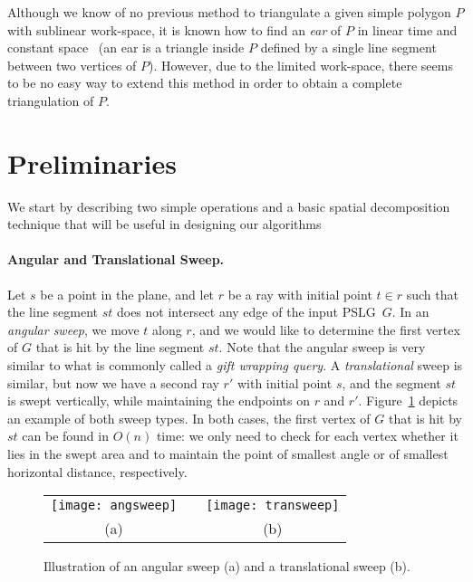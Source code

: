 \documentclass[11pt,a4paper]{article}
\newcommand{\pslg}{PSLG}
\begin{document}
Although we know of no previous method to triangulate a given
simple polygon $P$ with sublinear work-space, it is known how
to find an \emph{ear} of $P$ in linear time and constant
space~\cite{ElGindyEvTo93} (an ear is a triangle inside $P$
defined by a single line segment between two vertices of $P$).
However, due to the limited work-space, there seems to be no easy way
to extend this method in order to obtain a complete triangulation of $P$.


\section{Preliminaries}
\label{sec:primitive}

We start by describing two simple operations and a basic spatial
decomposition technique that will be useful in designing our algorithms

\paragraph{Angular and Translational Sweep.} Let $s$ be a point in the
plane, and let $r$ be a ray with initial point $t\in r$ such that the line
segment $st$ does not intersect any edge of the input \pslg\ $G$.
In  an  \emph{angular sweep}, we move $t$ along $r$, and we would like
to determine the first vertex of $G$ that is hit by the line segment
$st$.
Note that the angular sweep is very similar to what is commonly called
a \emph{gift wrapping query}.
A \emph{translational} sweep is similar, but now we have a second ray
$r'$ with initial point $s$, and the segment $st$ is
swept vertically,  while maintaining the endpoints on $r$ and $r'$. Figure~\ref{fig:sweeps} depicts
an example of both sweep types.
In both cases, the first vertex of $G$ that is hit by $st$ can be found in
$O(n)$ time: we only need to check for each vertex whether it lies
in the swept area and to maintain the point of smallest angle or of smallest
horizontal distance, respectively.

\begin{figure}[htbp]
\begin{center}
\begin{tabular}{cp{8mm}c}
\texttt{[image: angsweep]} &&
\texttt{[image: transweep]} \\
(a) & &(b)
\end{tabular}
\caption{Illustration of an angular sweep (a) and a translational sweep (b).}
\label{fig:sweeps}
\end{center}
\end{figure}
\end{document}
